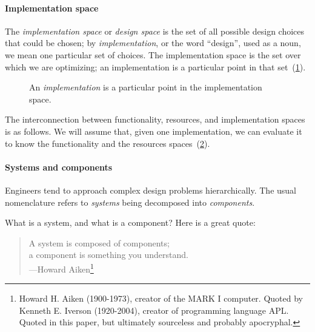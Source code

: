 \paragraph{Implementation space}

The \emph{implementation space} or \textit{design space} is the set of all possible design choices that could be chosen;
by \textit{implementation}, or the word ``design'', used as a noun, we mean one particular  set of choices. The implementation space is the set over which we are optimizing; an implementation is a particular point in that set~(\cref{fig:impspace}).

\begin{figure}[h!]
    \caption{An \emph{implementation} is a particular point in the implementation space.}
    \label{fig:impspace}
\end{figure}


The interconnection between functionality, resources, and implementation spaces
is as follows. We will assume that, given one implementation, we can evaluate it
to know the functionality and the resources spaces~(\cref{fig:FIR}).

\begin{figure}[h!]
    \centering
    \caption{\label{fig:FIR}}
\end{figure}


%


\paragraph{Systems and components}

Engineers tend to approach complex design problems hierarchically.  The usual
nomenclature refers to \textit{systems} being decomposed into \textit{components}.

What is a system, and what is a component? Here is a great quote:

\begin{quote}
A system is composed of components; \\
a component is something you understand.\\
---Howard Aiken\footnote{
Howard H. Aiken (1900-1973), creator of the MARK I computer.
Quoted by Kenneth E. Iverson (1920-2004), creator of programming language APL.
Quoted in this paper\cite{that-paper},
  but ultimately sourceless and probably apocryphal.}
\end{quote}

